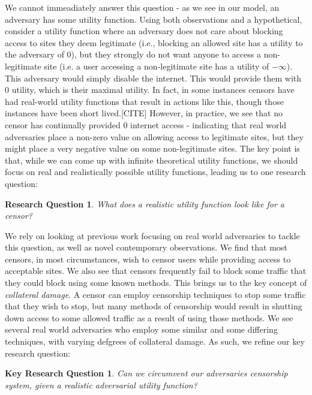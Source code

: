 \documentclass[12pt]{report}
\newtheorem{question}{Research Question}
\newtheorem*{keyq}{Key Research Question}
\begin{document}
We cannot immeadiately answer this question - as we see in our model, an adversary has some utility function. Using both observations and a hypothetical, consider a utility function where an adversary does not care about blocking access to sites they deem legitimate (i.e., blocking an allowed site has a utility to the adversary of $0$), but they strongly do not want anyone to access a non-legitimate site (i.e. a user accessing a non-legitimate site has a utility of $-\infty$). This adversary would simply disable the internet. This would provide them with $0$ utility, which is their maximal utility. In fact, in some instances censors have had real-world utility functions that result in actions like this, though those instances have been short lived.[CITE] However, in practice, we see that no censor has continually provided 0 internet access - indicating that real world adversaries place a non-zero value on allowing access to legitimate sites, but they might place a very negative value on some non-legitimate sites. The key point is that, while we can come up with infinite theoretical utility functions, we should focus on real and realistically possible utility functions, leading us to one research question:

\begin{question}
What does a realistic utility function look like for a censor?
\end{question}

We rely on looking at previous work focusing on real world adversaries to tackle this question, as well as novel contemporary observations. We find that most censors, in most circumstances, wish to censor users while providing access to acceptable sites. We also see that censors frequently fail to block some traffic that they could block using some known methods. This brings us to the key concept of \emph{collateral damage}. A censor can employ censorship techniques to stop some traffic that they wish to stop, but many methods of censorship would result in shutting down access to some allowed traffic as a result of using those methods. We see several real world adversaries who employ some similar and some differing techniques, with varying defgrees of collateral damage. As such, we refine our key research question:

\begin{keyq}
Can we circumvent our adversaries censorship system, given a realistic adversarial utility function?
\end{keyq}
\end{document}
